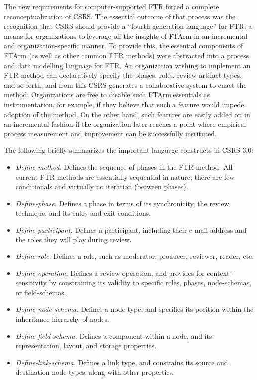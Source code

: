 The new requirements for computer-supported FTR forced a complete
reconceptualization of CSRS.  The essential outcome of that process was the
recognition that CSRS should provide a ``fourth generation language'' for
FTR: a means for organizations to leverage off the insights of FTArm in an
incremental and organization-specific manner.  To provide this, the
essential components of FTArm (as well as other common FTR methods) were
abstracted into a process and data modelling language for FTR.  An
organization wishing to implement an FTR method can declaratively specify
the phases, roles, review artifact types, and so forth, and from this CSRS
generates a collaborative system to enact the method.  Organizations are
free to disable such FTArm essentials as instrumentation, for example, if
they believe that such a feature would impede adoption of the method.  On
the other hand, such features are easily added on in an incremental fashion
if the organization later reaches a point where empirical process
measurement and improvement can be successfully instituted.

The following briefly summarizes the important language constructs in CSRS
3.0:

\begin{itemize}
\item {\em Define-method.} Defines the sequence of phases in the FTR
  method. All current FTR methods are essentially sequential in nature;
  there are few conditionals and virtually no iteration (between phases).
  
\item {\em Define-phase.} Defines a phase in terms of its synchronicity,
  the review technique, and its entry and exit conditions.
  
\item {\em Define-participant.} Defines a participant, including their
  e-mail address and the roles they will play during review.
  
\item {\em Define-role.} Defines a role, such as moderator, producer,
  reviewer, reader, etc.
  
\item {\em Define-operation.} Defines a review operation, and provides
  for context-sensitivity by constraining its validity to specific roles,
  phases, node-schemas, or field-schemas.
  
\item {\em Define-node-schema.} Defines a node type, and specifies its
  position within the inheritance hierarchy of nodes.
  
\item {\em Define-field-schema.} Defines a component within a node, and its
  representation, layout, and storage properties.
  
\item {\em Define-link-schema.} Defines a link type, and constrains its
  source and destination node types, along with other properties.
\end{itemize}

